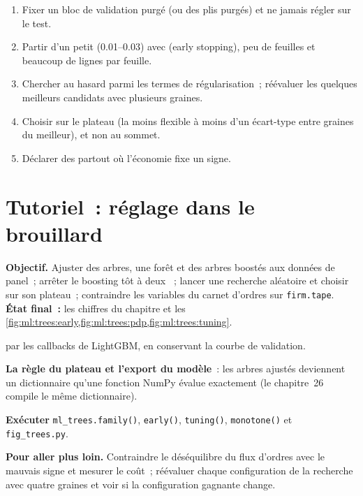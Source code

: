 \begin{method}\label{met:ml:trees:tuning}
\begin{enumerate}
\item Fixer un bloc de validation purgé (ou des plis purgés) et ne jamais régler sur le test.
\item Partir d'un petit  (0.01--0.03) avec  (early stopping), peu de feuilles et beaucoup de lignes par feuille.
\item Chercher au hasard parmi les termes de régularisation~; réévaluer les quelques meilleurs candidats avec plusieurs graines.
\item Choisir sur le plateau (la moins flexible à moins d'un écart-type entre graines du meilleur), et non au sommet.
\item Déclarer des  partout où l'économie fixe un signe.
\end{enumerate}
\end{method}

\section{Tutoriel~: réglage dans le brouillard}\label{tut:ml:trees-and-boosting:tut}

\begin{tutorial}
\textbf{Objectif.} Ajuster des arbres, une forêt et des arbres boostés aux données de panel~; arrêter le boosting tôt à deux ~; lancer une
recherche aléatoire et choisir sur son plateau~; contraindre les variables du carnet d'ordres sur \texttt{firm.tape}. \textbf{État final~:}
les chiffres du chapitre et les \cref{fig:ml:trees:early,fig:ml:trees:pdp,fig:ml:trees:tuning}.
\begin{tutsteps}
\item \textbf{} par les callbacks de LightGBM, en conservant la courbe de validation.
\label{lst:ml:trees:early}
\item \textbf{La règle du plateau et l'export du modèle}~: les arbres ajustés deviennent un dictionnaire qu'une fonction NumPy
évalue exactement (le chapitre~26 compile le même dictionnaire).
\label{lst:ml:trees:dump}
\item \textbf{Exécuter} \texttt{ml\_trees.family()}, \texttt{early()}, \texttt{tuning()}, \texttt{monotone()} et
\texttt{fig\_trees.py}.
\end{tutsteps}
\textbf{Pour aller plus loin.} Contraindre le déséquilibre du flux d'ordres avec le mauvais signe et mesurer le coût~; réévaluer chaque
configuration de la recherche avec quatre graines et voir si la configuration gagnante change.
\end{tutorial}

